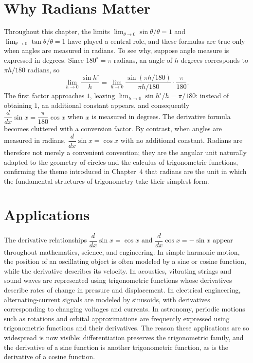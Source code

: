 \section{Why Radians Matter}

Throughout this chapter, the limits $\lim_{\theta\to0} \sin\theta/\theta
= 1$ and $\lim_{\theta\to0} \tan\theta/\theta = 1$ have played a central
role, and these formulas are true only when angles are measured in
radians. To see why, suppose angle measure is expressed in degrees.
Since $180^\circ = \pi$ radians, an angle of $h$ degrees corresponds to
$\pi h/180$ radians, so
\[
\lim_{h\to0} \frac{\sin h^\circ}{h} = \lim_{h\to0}
\frac{\sin(\pi h/180)}{\pi h/180}\cdot\frac{\pi}{180}.
\]
The first factor approaches $1$, leaving $\lim_{h\to0} \sin h^\circ/h =
\pi/180$: instead of obtaining $1$, an additional constant appears, and
consequently $\dfrac{d}{dx}\sin x = \dfrac{\pi}{180}\cos x$ when $x$ is
measured in degrees. The derivative formula becomes cluttered with a
conversion factor. By contrast, when angles are measured in radians,
$\dfrac{d}{dx}\sin x = \cos x$ with no additional constant. Radians are
therefore not merely a convenient convention; they are the angular unit
naturally adapted to the geometry of circles and the calculus of
trigonometric functions, confirming the theme introduced in Chapter~4
that radians are the unit in which the fundamental structures of
trigonometry take their simplest form.

\section{Applications}

The derivative relationships $\dfrac{d}{dx}\sin x = \cos x$ and
$\dfrac{d}{dx}\cos x = -\sin x$ appear throughout mathematics, science,
and engineering. In simple harmonic motion, the position of an
oscillating object is often modeled by a sine or cosine function, while
the derivative describes its velocity. In acoustics, vibrating strings
and sound waves are represented using trigonometric functions whose
derivatives describe rates of change in pressure and displacement. In
electrical engineering, alternating-current signals are modeled by
sinusoids, with derivatives corresponding to changing voltages and
currents. In astronomy, periodic motions such as rotations and orbital
approximations are frequently expressed using trigonometric functions
and their derivatives. The reason these applications are so widespread
is now visible: differentiation preserves the trigonometric family, and
the derivative of a sine function is another trigonometric function, as
is the derivative of a cosine function.

